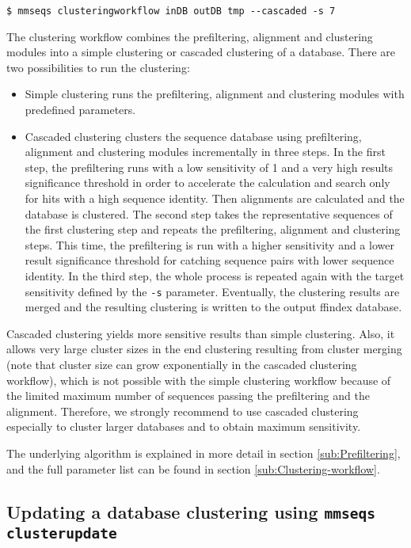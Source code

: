 \documentclass[11pt,a4paper]{report}
\begin{document}
\texttt{\$ mmseqs clusteringworkflow inDB outDB tmp -{}-cascaded -s 7}

The clustering workflow combines the prefiltering, alignment and clustering
modules into a simple clustering or\emph{ }cascaded clustering of
a database. There are two possibilities to run the clustering:
\begin{itemize}
\item Simple clustering\emph{ }runs the prefiltering, alignment and clustering
modules with predefined parameters.
\item Cascaded clustering\emph{ }clusters the sequence database using prefiltering,
alignment and clustering modules incrementally in three steps. In
the first step, the prefiltering runs with a low sensitivity of 1
and a very high results significance threshold in order to accelerate
the calculation and search only for hits with a high sequence identity.
Then alignments are calculated and the database is clustered. The
second step takes the representative sequences of the first clustering
step and repeats the prefiltering, alignment and clustering steps.
This time, the prefiltering is run with a higher sensitivity and a
lower result significance threshold for catching sequence pairs with
lower sequence identity. In the third step, the whole process is repeated
again with the target sensitivity defined by the \texttt{-s} parameter.
Eventually, the clustering results are merged and the resulting clustering
is written to the output ffindex database. 
\end{itemize}
Cascaded clustering yields more sensitive results than simple clustering.
Also, it allows very large cluster sizes in the end clustering resulting
from cluster merging (note that cluster size can grow exponentially
in the cascaded clustering workflow), which is not possible with the
simple clustering workflow because of the limited maximum number of
sequences passing the prefiltering and the alignment. Therefore, we
strongly recommend to use cascaded clustering especially to cluster
larger databases and to obtain maximum sensitivity.

The underlying algorithm is explained in more detail in section \ref{sub:Prefiltering},
and the full parameter list can be found in section \ref{sub:Clustering-workflow}.


\subsection{Updating a database clustering using \texttt{mmseqs clusterupdate}}
\end{document}
